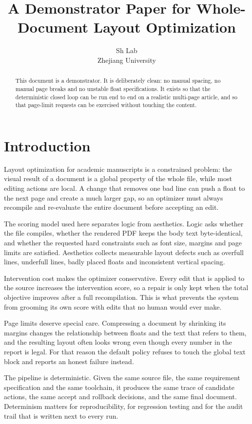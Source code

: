 \documentclass[10pt,a4paper]{article}
\title{A Demonstrator Paper for Whole-Document Layout Optimization}
\author{Sh Lab \\ Zhejiang University}
\date{}
\begin{document}
\maketitle
\begin{abstract}
This document is a demonstrator. It is deliberately clean: no manual spacing,
no manual page breaks and no unstable float specifications. It exists so that
the deterministic closed loop can be run end to end on a realistic multi-page
article, and so that page-limit requests can be exercised without touching the
content.
\end{abstract}

\section{Introduction}
Layout optimization for academic manuscripts is a constrained problem: the visual result of a document is a global property of the whole file, while most editing actions are local. A change that removes one bad line can push a float to the next page and create a much larger gap, so an optimizer must always recompile and re-evaluate the entire document before accepting an edit.

The scoring model used here separates logic from aesthetics. Logic asks whether the file compiles, whether the rendered PDF keeps the body text byte-identical, and whether the requested hard constraints such as font size, margins and page limits are satisfied. Aesthetics collects measurable layout defects such as overfull lines, underfull lines, badly placed floats and inconsistent vertical spacing.

Intervention cost makes the optimizer conservative. Every edit that is applied to the source increases the intervention score, so a repair is only kept when the total objective improves after a full recompilation. This is what prevents the system from grooming its own score with edits that no human would ever make.

Page limits deserve special care. Compressing a document by shrinking its margins changes the relationship between floats and the text that refers to them, and the resulting layout often looks wrong even though every number in the report is legal. For that reason the default policy refuses to touch the global text block and reports an honest failure instead.

The pipeline is deterministic. Given the same source file, the same requirement specification and the same toolchain, it produces the same trace of candidate actions, the same accept and rollback decisions, and the same final document. Determinism matters for reproducibility, for regression testing and for the audit trail that is written next to every run.
\end{document}
